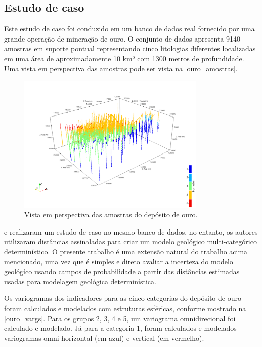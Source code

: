\subsection{Estudo de caso}

Este estudo de caso foi conduzido em um banco de dados real fornecido por uma grande operação de mineração de ouro. O conjunto de dados apresenta 9140 amostras em suporte pontual representando cinco litologias diferentes localizadas em uma área de aproximadamente 10 km² com 1300 metros de profundidade. Uma vista em perspectiva das amostras pode ser vista na \autoref{ouro_amostras}.

\begin{figure}[H]
	\caption{\label{ouro_amostras} Vista em perspectiva das amostras do depósito de ouro.}
	\centering
		\includegraphics[width=0.8\textwidth]{capitulo_3/imagens/points_perpect.png}
\end{figure}

 e  realizaram um estudo de caso no mesmo banco de dados, no entanto, os autores utilizaram distâncias assinaladas para criar um modelo geológico multi-categórico determinístico. O presente trabalho é uma extensão natural do trabalho acima mencionado, uma vez que é simples e direto avaliar a incerteza do modelo geológico usando campos de probabilidade a partir das distâncias estimadas usadas para modelagem geológica determinística.

Os variogramas dos indicadores para as cinco categorias do depósito de ouro foram calculados e modelados com estruturas esféricas, conforme mostrado na \autoref{ouro_vargs}. Para os grupos 2, 3, 4 e 5, um variograma omnidirecional foi calculado e modelado. Já para a categoria 1, foram calculados e modelados variogramas omni-horizontal (em azul) e vertical (em vermelho).

